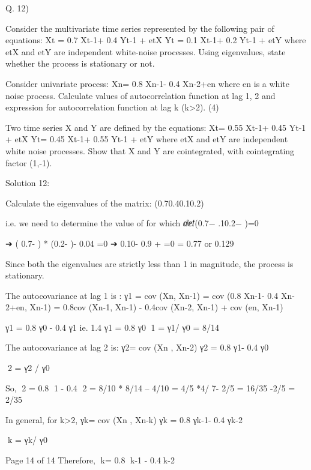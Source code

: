 \documentclass[a4paper,12pt]{article}
\begin{document}

Q. 12)
\item  Consider the multivariate time series represented by the following pair of equations:
Xt = 0.7 Xt-1+ 0.4 Yt-1 + etX
Yt = 0.1 Xt-1+ 0.2 Yt-1 + etY
where etX and etY are independent white-noise processes. Using eigenvalues, state whether the process is stationary or not.

\item   Consider univariate process:
Xn= 0.8 Xn-1- 0.4 Xn-2+en
where en is a white noise process.
Calculate values of autocorrelation function at lag 1, 2 and expression for autocorrelation function at lag k (k>2).
(4)
\item   Two time series X and Y are defined by the equations:
Xt= 0.55 Xt-1+ 0.45 Yt-1 + etX
Yt= 0.45 Xt-1+ 0.55 Yt-1 + etY
where etX and etY are independent white noise processes.
Show that X and Y are cointegrated, with cointegrating factor (1,-1).

Solution 12:
\item 
Calculate the eigenvalues of the matrix:
(0.70.40.10.2)

i.e. we need to determine the value of \lambda for which ⅆⅇ𝑡(0.7− .10.2− \lambda)=0

➔ ( 0.7- \lambda) * (0.2- \lambda)- 0.04 =0
➔ 0.10- 0.9 \lambda +  =0
\lambda = 0.77 or 0.129

Since both the eigenvalues are strictly less than 1 in magnitude, the process is stationary.


\item  
The autocovariance at lag 1 is :
γ1 = cov (Xn, Xn-1)
= cov (0.8 Xn-1- 0.4 Xn-2+en, Xn-1)
= 0.8cov (Xn-1, Xn-1) - 0.4cov (Xn-2, Xn-1) + cov (en, Xn-1)

γ1 = 0.8 γ0 - 0.4 γ1
ie. 1.4 γ1 = 0.8 γ0
1 = γ1/ γ0 = 8/14

The autocovariance at lag 2 is:
γ2= cov (Xn , Xn-2)
γ2 = 0.8 γ1- 0.4 γ0

2 = γ2 / γ0

So, 2 = 0.8 1 - 0.4
2 = 8/10 * 8/14 – 4/10
= 4/5 *4/ 7- 2/5
= 16/35 -2/5
= 2/35

In general, for k>2,
γk= cov (Xn , Xn-k)
γk = 0.8 γk-1- 0.4 γk-2

k = γk/ γ0

Page 14 of 14
Therefore,
k= 0.8 k-1 - 0.4k-2
\end{document}
